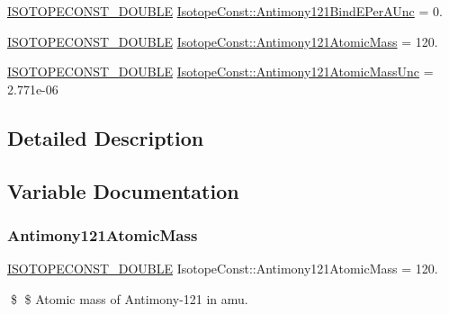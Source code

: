 \begin{DoxyCompactItemize}
\mbox{\hyperlink{group___isotope_const-_macros_ga8f45a7272ce02c0b4c65c44636ed719a}{I\+S\+O\+T\+O\+P\+E\+C\+O\+N\+S\+T\+\_\+\+D\+O\+U\+B\+LE}} \mbox{\hyperlink{group___isotope_const-_antimony-_sb121_gaf6bc2fdb9f9f3d3fe9df0f25821ed56b}{Isotope\+Const\+::\+Antimony121\+Bind\+E\+Per\+A\+Unc}} = 0.
\item 
\mbox{\hyperlink{group___isotope_const-_macros_ga8f45a7272ce02c0b4c65c44636ed719a}{I\+S\+O\+T\+O\+P\+E\+C\+O\+N\+S\+T\+\_\+\+D\+O\+U\+B\+LE}} \mbox{\hyperlink{group___isotope_const-_antimony-_sb121_ga0ac97cf1aed1513044161be1f23b7d9e}{Isotope\+Const\+::\+Antimony121\+Atomic\+Mass}} = 120.
\item 
\mbox{\hyperlink{group___isotope_const-_macros_ga8f45a7272ce02c0b4c65c44636ed719a}{I\+S\+O\+T\+O\+P\+E\+C\+O\+N\+S\+T\+\_\+\+D\+O\+U\+B\+LE}} \mbox{\hyperlink{group___isotope_const-_antimony-_sb121_ga2b08d7f3a755eaf7984b32a6354d82cf}{Isotope\+Const\+::\+Antimony121\+Atomic\+Mass\+Unc}} = 2.\+771e-\/06
\end{DoxyCompactItemize}


\subsection{Detailed Description}


\subsection{Variable Documentation}
\mbox{\label{group___isotope_const-_antimony-_sb121_ga0ac97cf1aed1513044161be1f23b7d9e}} 
\subsubsection{\texorpdfstring{Antimony121\+Atomic\+Mass}{Antimony121AtomicMass}}
{\footnotesize\ttfamily \mbox{\hyperlink{group___isotope_const-_macros_ga8f45a7272ce02c0b4c65c44636ed719a}{I\+S\+O\+T\+O\+P\+E\+C\+O\+N\+S\+T\+\_\+\+D\+O\+U\+B\+LE}} Isotope\+Const\+::\+Antimony121\+Atomic\+Mass = 120.}

\$ \$ Atomic mass of Antimony-\/121 in amu. \mbox{\label{group___isotope_const-_antimony-_sb121_ga2b08d7f3a755eaf7984b32a6354d82cf}} 

